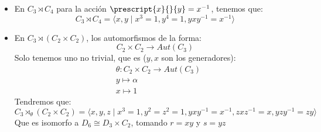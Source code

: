 \begin{itemize}
\begin{itemize}
    \item En $C_3\rtimes C_4$ para la acción $\prescript{x}{}{y} = x^{-1}$, tenemos que:
        \begin{equation*}
            C_3 \rtimes C_4 = \langle x,y\mid x^3=1, y^4 = 1, yxy^{-1}=x^{-1} \rangle 
        \end{equation*}
    \item En $C_3\rtimes (C_2\times C_2)$, los automorfismos de la forma:
        \begin{equation*}
            C_2\times C_2\to Aut(C_3)
        \end{equation*}
        Solo tenemos uno no trivial, que es ($y,x$ son los generadores):
        \begin{align*}
            &\theta:C_2\times C_2 \to Aut(C_3) \\
            &y\longmapsto \alpha \\
            &x\longmapsto 1
        \end{align*}
        Tendremos que:
        \begin{equation*}
            C_3\rtimes_\theta(C_2\times C_2) = \langle x,y,z \mid x^3=1, y^2 = z^2 = 1, yxy^{-1}=x^{-1},zxz^{-1}=x, yzy^{-1}=zy \rangle 
        \end{equation*}
        Que es isomorfo a $D_6\cong D_3\times C_2$, tomando $r =xy$ y $s = yz$ %
\end{itemize}


\end{itemize}
